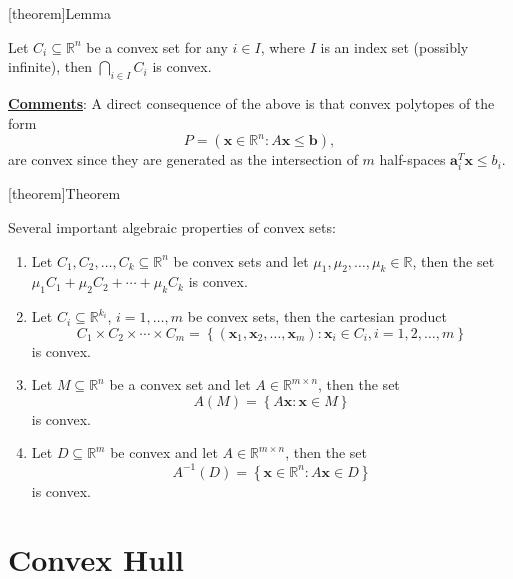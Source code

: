 \documentclass[12pt]{report}
\theoremstyle{definition}
\begin{document}
[theorem]{Lemma}
\begin{intersection of convex sets}
    Let $C_i\subseteq\mathbb{R}^{n}$ be a convex set for any $i\in I$, where $I$
    is an index set (possibly infinite), then $\bigcap_{i\in I}C_i$ is convex.
\end{intersection of convex sets}
\underline{\textbf{Comments}}: A direct consequence of the above is that convex
polytopes of the form
\[
    P=\left(\mathbf{x}\in\mathbb{R}^{n}:A\mathbf{x}\le\mathbf{b}\right),
\]
are convex since they are generated as the intersection of $m$ half-spaces
$\mathbf{a}_i^T\mathbf{x}\le b_i$.

[theorem]{Theorem}
\begin{convex sets properties}
    Several important algebraic properties of convex sets:
    \begin{enumerate}
        \item Let $C_1,C_2,\ldots,C_k\subseteq\mathbb{R}^{n}$ be convex sets and
            let $\mu_1,\mu_2,\ldots,\mu_k\in\mathbb{R}$, then the set
            $\mu_1C_1+\mu_2C_2+\cdots+\mu_kC_k$ is convex.
        \item Let $C_i\subseteq\mathbb{R}^{k_i}$, $i=1,\ldots,m$ be convex sets,
            then the cartesian product
            \[
                C_1\times C_2\times\cdots\times C_m
                =\left\{(\mathbf{x}_1,\mathbf{x}_2,\ldots,\mathbf{x}_m):\mathbf{x}_i\in
                C_i,i=1,2,\ldots,m\right\}
            \]
            is convex.
        \item Let $M\subseteq\mathbb{R}^{n}$ be a convex set and let
            $A\in\mathbb{R}^{m\times n}$, then the set
            \[
                A(M)=\left\{A\mathbf{x}:\mathbf{x}\in M\right\}
            \]
            is convex.
        \item Let $D\subseteq\mathbb{R}^{m}$ be convex and let
            $A\in\mathbb{R}^{m\times n}$, then the set
            \[
                A^{-1}(D)=\left\{\mathbf{x}\in\mathbb{R}^{n}:A\mathbf{x}\in D\right\}
            \]
            is convex.
    \end{enumerate} 
\end{convex sets properties}

\section{Convex Hull}
\end{document}
